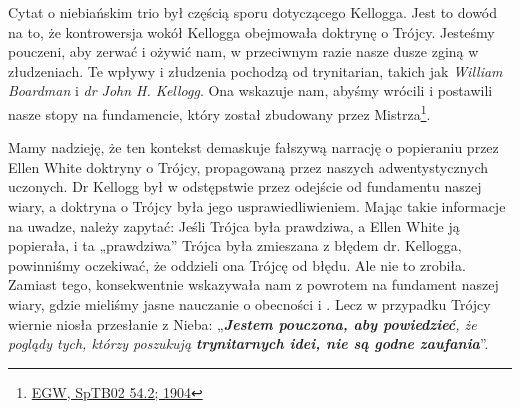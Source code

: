 Cytat o niebiańskim trio był częścią sporu dotyczącego Kellogga. Jest to dowód na to, że kontrowersja wokół Kellogga obejmowała doktrynę o Trójcy. Jesteśmy pouczeni, aby zerwać  i ożywić  nam, w przeciwnym razie nasze dusze zginą w złudzeniach. Te wpływy i złudzenia pochodzą od trynitarian, takich jak \textit{William Boardman} i \textit{dr John H. Kellogg}. Ona wskazuje nam, abyśmy wrócili i postawili nasze stopy na fundamencie, który został zbudowany przez Mistrza\footnote{\href{https://egwwritings.org/?ref=en_SpTB02.54.2&para=417.276}{EGW, SpTB02 54.2; 1904}}.

Mamy nadzieję, że ten kontekst demaskuje fałszywą narrację o popieraniu przez Ellen White doktryny o Trójcy, propagowaną przez naszych adwentystycznych uczonych. Dr Kellogg był w odstępstwie przez odejście od fundamentu naszej wiary, a doktryna o Trójcy była jego usprawiedliwieniem. Mając takie informacje na uwadze, należy zapytać: Jeśli Trójca była prawdziwa, a Ellen White ją popierała, i ta „prawdziwa” Trójca była zmieszana z błędem dr. Kellogga, powinniśmy oczekiwać, że oddzieli ona Trójcę od błędu. Ale nie to zrobiła. Zamiast tego, konsekwentnie wskazywała nam z powrotem na fundament naszej wiary, gdzie mieliśmy jasne nauczanie o obecności i . Lecz w przypadku Trójcy wiernie niosła przesłanie z Nieba: „\textit{\textbf{Jestem pouczona, aby powiedzieć}, że poglądy tych, którzy poszukują \textbf{trynitarnych idei, nie są godne zaufania}}”.


